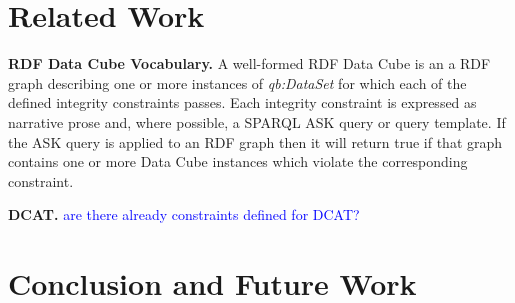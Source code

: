 \documentclass{elsart3p}    %
\begin{document}
\section{Related Work}

\textbf{RDF Data Cube Vocabulary.}
A well-formed RDF Data Cube is an a RDF graph describing one or more instances of {\em qb:DataSet} for which each of the defined integrity constraints passes.
Each integrity constraint is expressed as narrative prose and, where possible, a SPARQL ASK query or query template. 
If the ASK query is applied to an RDF graph then it will return true if that graph contains one or more Data Cube instances which violate the corresponding constraint.
\cite{CyganiakReynolds2014}

\textbf{DCAT.}
\textcolor{blue}{are there already constraints defined for DCAT?}

\section{Conclusion and Future Work}




\end{document}
